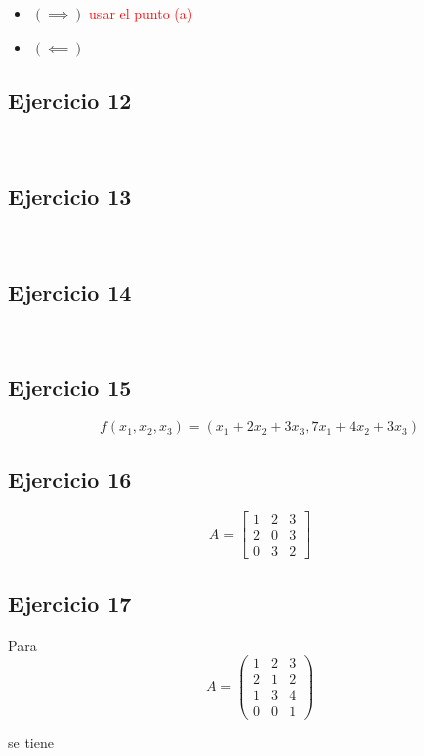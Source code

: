 \documentclass{article}
\begin{document}
\begin{itemize}
    \item[] $(\implies)$ \textcolor{red}{usar el punto (a)}
    \item[] $(\impliedby)$ 
\end{itemize}

\subsection*{Ejercicio 12}

\

\subsection*{Ejercicio 13}

\

\subsection*{Ejercicio 14}

\

\subsection*{Ejercicio 15}

\[f(x_1,x_2,x_3) = (x_1 + 2x_2 + 3x_3, 7x_1 + 4x_2 + 3x_3)\]

\subsection*{Ejercicio 16}

\[A = \begin{bmatrix}
    1 & 2 & 3 \\
    2 & 0 & 3 \\
    0 & 3 & 2
\end{bmatrix}\]

\subsection*{Ejercicio 17}

Para \[A = \begin{pmatrix}
    1 & 2 & 3 \\
    2 & 1 & 2 \\
    1 & 3 & 4 \\
    0 & 0 & 1
\end{pmatrix}\]

\noindent se tiene 
\end{document}
